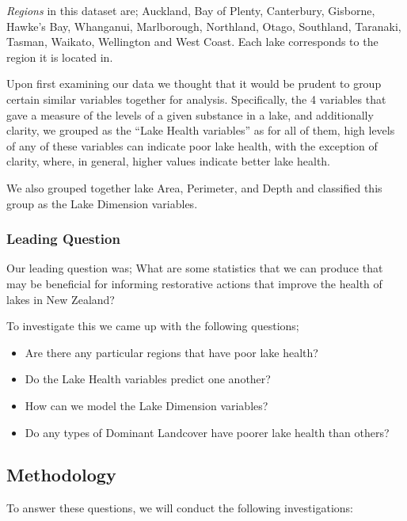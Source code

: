 \documentclass[
]{article}
\begin{document}
\emph{Regions} in this dataset are; Auckland, Bay of Plenty, Canterbury, Gisborne, Hawke's Bay, Whanganui, Marlborough, Northland, Otago, Southland, Taranaki, Tasman, Waikato, Wellington and West Coast. Each lake corresponds to the region it is located in.

Upon first examining our data we thought that it would be prudent to group certain similar variables together for analysis. Specifically, the 4 variables that gave a measure of the levels of a given substance in a lake, and additionally clarity, we grouped as the ``Lake Health variables'' as for all of them, high levels of any of these variables can indicate poor lake health, with the exception of clarity, where, in general, higher values indicate better lake health.

We also grouped together lake Area, Perimeter, and Depth and classified this group as the Lake Dimension variables.

\hypertarget{leading-question}{%
\subsubsection{Leading Question}\label{leading-question}}

Our leading question was; What are some statistics that we can produce that may be beneficial for informing restorative actions that improve the health of lakes in New Zealand?

To investigate this we came up with the following questions;

\begin{itemize}
\item
  Are there any particular regions that have poor lake health?
\item
  Do the Lake Health variables predict one another?
\item
  How can we model the Lake Dimension variables?
\item
  Do any types of Dominant Landcover have poorer lake health than others?
\end{itemize}

\hypertarget{methodology}{%
\subsection{Methodology}\label{methodology}}

To answer these questions, we will conduct the following investigations:
\end{document}
